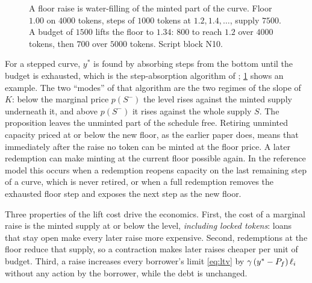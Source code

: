 \begin{figure}[t]
\centering
{}
\caption{A floor raise is water-filling of the minted part of the curve. Floor $1.00$ on $4000$ tokens, steps of $1000$ tokens at $1.2,1.4,\dots$, supply $7500$. A budget of $1500$ lifts the floor to $1.34$: $800$ to reach $1.2$ over $4000$ tokens, then $700$ over $5000$ tokens. Script block N10.}\label{fig:raise}
\end{figure}

For a stepped curve, $y^\ast$ is found by absorbing steps from the bottom until the budget is exhausted, which is the step-absorption algorithm of \vone; \cref{fig:raise} shows an example. The two ``modes'' of that algorithm are the two regimes of the slope of $K$: below the marginal price $p(S^-)$ the level rises against the minted supply underneath it, and above $p(S^-)$ it rises against the whole supply $S$. The proposition leaves the unminted part of the schedule free. Retiring unminted capacity priced at or below the new floor, as the earlier paper does, means that immediately after the raise no token can be minted at the floor price. A later redemption can make minting at the current floor possible again. In the reference model this occurs when a redemption reopens capacity on the last remaining step of a curve, which is never retired, or when a full redemption removes the exhausted floor step and exposes the next step as the new floor.

Three properties of the lift cost drive the economics. First, the cost of a marginal raise is the minted supply at or below the level, \emph{including locked tokens}: loans that stay open make every later raise more expensive. Second, redemptions at the floor reduce that supply, so a contraction makes later raises cheaper per unit of budget. Third, a raise increases every borrower's limit \eqref{eq:ltv} by $\gamma\,(y^\ast-P_f)\,\ell_i$ without any action by the borrower, while the debt is unchanged.

